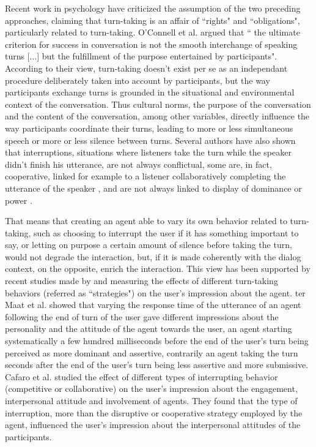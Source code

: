 Recent work in psychology have criticized
the assumption of the two preceding approaches, claiming that turn-taking is an affair of ``rights" and ``obligations", particularly related to turn-taking. O'Connell et al.\citep{oconnell_turn-taking_1990} argued that `` the ultimate criterion for success in conversation is not the smooth interchange of speaking
turns [...] but the fulfillment of the purpose entertained
by participants". According to their view, turn-taking
doesn't exist per se as an independant procedure deliberately
taken into account by participants, but the way
participants exchange turns is grounded in the situational
and environmental context of the conversation.
Thus cultural norms, the purpose of the conversation
and the content of the conversation, among other variables,
directly influence the way participants coordinate
their turns, leading to more or less simultaneous speech
or more or less silence between turns. Several authors
have also shown that interruptions, situations where listeners
take the turn while the speaker didn't finish his
utterance, are not always conflictual, some are, in fact,
cooperative, linked for example to a listener collaboratively
completing the utterance of the speaker \citep{clancy_co-constructed_2015}, and
are not always linked to display of dominance or power
\citep{goldberg_interrupting_1990}.

That means that creating an agent able to vary its
own behavior related to turn-taking, such as choosing to
interrupt the user if it has something important to say,
or letting on purpose a certain amount of silence before
taking the turn, would not degrade the interaction, but,
if it is made coherently with the dialog context, on the
opposite, enrich the interaction. This view has been
supported by recent studies made by \citep{ter_maat_how_2010} and \citep{cafaro_effects_2016} measuring
the effects of different turn-taking behaviors (referred as ``strategies") on
the user's impression about the agent.
ter Maat et al.\citep{ter_maat_how_2010} showed that varying the response time of the utterance of an agent following the end of turn of the user gave different impressions about the personality and the attitude of the agent towards the user, an agent starting systematically a few hundred milliseconds before the end of the user's turn being perceived as more dominant and assertive, contrarily an agent taking the turn seconds after the end of the user's turn being less assertive and more submissive.  
Cafaro et al.\citep{cafaro_effects_2016} studied the effect of different types of interrupting
behavior (competitive or collaborative) on the user's
impression about the engagement, interpersonal attitude
and involvement of agents. They found that the type of interruption, more than
the disruptive or cooperative strategy employed by the
agent, influenced the user's impression about the interpersonal
attitudes of the participants.

